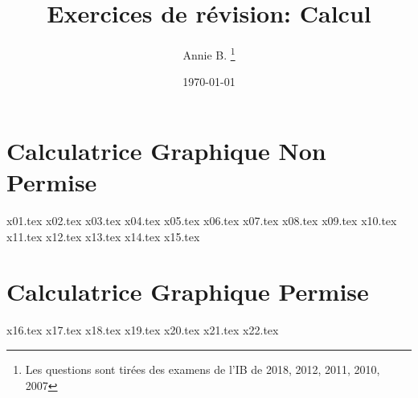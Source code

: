 \documentclass[10pt]{article}
\newcounter{question}
\begin{document}
 

\title{Exercices de révision: Calcul}
\author{Annie B. \thanks{Les questions sont tirées des examens de l’IB de 2018, 2012, 2011, 2010, 2007}}
\date{\today}
\maketitle

\newpage
\section*{\textbf{Calculatrice Graphique Non Permise}}
{x01.tex}
\newpage
{x02.tex}
\bigskip
{x03.tex}
\newpage
{x04.tex}
\bigskip
{x05.tex}
\newpage
{x06.tex}
\bigskip
{x07.tex}
\newpage
{x08.tex}
\bigskip
{x09.tex}
\newpage
{x10.tex}
\bigskip
{x11.tex}
\newpage
{x12.tex}
\bigskip
{x13.tex}
\bigskip
{x14.tex}
\bigskip
{x15.tex}
\newpage
\section*{\textbf{Calculatrice Graphique Permise}}
{x16.tex}
\newpage
{x17.tex}
\bigskip
{x18.tex}
\bigskip
{x19.tex}
\newpage
{x20.tex}
\bigskip
{x21.tex}
\bigskip
{x22.tex}
\end{document}
